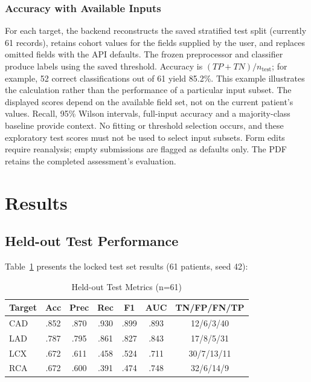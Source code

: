 \documentclass[conference]{IEEEtran}
\begin{document}
\subsubsection{Accuracy with Available Inputs}

For each target, the backend reconstructs the saved stratified test split (currently 61 records), retains cohort values for the fields supplied by the user, and replaces omitted fields with the API defaults. The frozen preprocessor and classifier produce labels using the saved threshold. Accuracy is $(TP+TN)/n_{\mathrm{test}}$; for example, 52 correct classifications out of 61 yield 85.2\%. This example illustrates the calculation rather than the performance of a particular input subset. The displayed scores depend on the available field set, not on the current patient's values. Recall, 95\% Wilson intervals, full-input accuracy and a majority-class baseline provide context. No fitting or threshold selection occurs, and these exploratory test scores must not be used to select input subsets. Form edits require reanalysis; empty submissions are flagged as defaults only. The PDF retains the completed assessment's evaluation.

\section{Results}

\subsection{Held-out Test Performance}

Table~\ref{tab:results} presents the locked test set results (61 patients, seed 42):

\begin{table}[htbp]
\centering
\caption{Held-out Test Metrics (n=61)}
\label{tab:results}
\footnotesize
\setlength{\tabcolsep}{3pt}
\begin{tabular}{lcccccc}
\toprule
\textbf{Target} & \textbf{Acc} & \textbf{Prec} & \textbf{Rec} & \textbf{F1} & \textbf{AUC} & \textbf{TN/FP/FN/TP} \\
\midrule
CAD & .852 & .870 & .930 & .899 & .893 & 12/6/3/40 \\
LAD & .787 & .795 & .861 & .827 & .843 & 17/8/5/31 \\
LCX & .672 & .611 & .458 & .524 & .711 & 30/7/13/11 \\
RCA & .672 & .600 & .391 & .474 & .748 & 32/6/14/9 \\
\bottomrule
\end{tabular}
\end{table}
\end{document}
